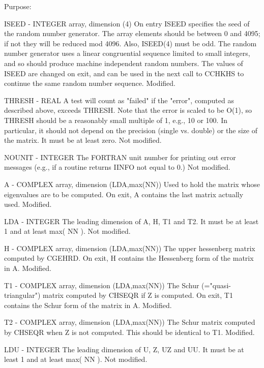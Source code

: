 \begin{DoxyParagraph}{Purpose\+: }
\begin{DoxyVerb}
  ISEED  - INTEGER array, dimension (4)
           On entry ISEED specifies the seed of the random number
           generator. The array elements should be between 0 and 4095;
           if not they will be reduced mod 4096.  Also, ISEED(4) must
           be odd.  The random number generator uses a linear
           congruential sequence limited to small integers, and so
           should produce machine independent random numbers. The
           values of ISEED are changed on exit, and can be used in the
           next call to CCHKHS to continue the same random number
           sequence.
           Modified.

  THRESH - REAL
           A test will count as "failed" if the "error", computed as
           described above, exceeds THRESH.  Note that the error
           is scaled to be O(1), so THRESH should be a reasonably
           small multiple of 1, e.g., 10 or 100.  In particular,
           it should not depend on the precision (single vs. double)
           or the size of the matrix.  It must be at least zero.
           Not modified.

  NOUNIT - INTEGER
           The FORTRAN unit number for printing out error messages
           (e.g., if a routine returns IINFO not equal to 0.)
           Not modified.

  A      - COMPLEX array, dimension (LDA,max(NN))
           Used to hold the matrix whose eigenvalues are to be
           computed.  On exit, A contains the last matrix actually
           used.
           Modified.

  LDA    - INTEGER
           The leading dimension of A, H, T1 and T2.  It must be at
           least 1 and at least max( NN ).
           Not modified.

  H      - COMPLEX array, dimension (LDA,max(NN))
           The upper hessenberg matrix computed by CGEHRD.  On exit,
           H contains the Hessenberg form of the matrix in A.
           Modified.

  T1     - COMPLEX array, dimension (LDA,max(NN))
           The Schur (="quasi-triangular") matrix computed by CHSEQR
           if Z is computed.  On exit, T1 contains the Schur form of
           the matrix in A.
           Modified.

  T2     - COMPLEX array, dimension (LDA,max(NN))
           The Schur matrix computed by CHSEQR when Z is not computed.
           This should be identical to T1.
           Modified.

  LDU    - INTEGER
           The leading dimension of U, Z, UZ and UU.  It must be at
           least 1 and at least max( NN ).
           Not modified.


\end{DoxyVerb}
\end{DoxyParagraph}
